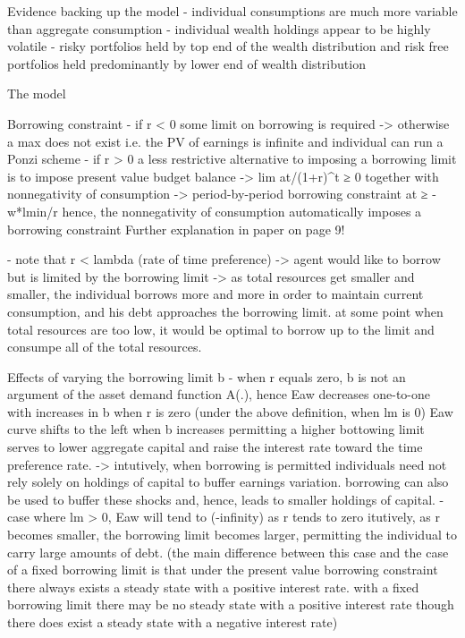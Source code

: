Evidence backing up the model
- individual consumptions are much more variable than aggregate consumption
- individual wealth holdings appear to be highly volatile
- risky portfolios held by top end of the wealth distribution and risk free portfolios held predominantly by lower end of wealth distribution

The model

Borrowing constraint
- if r < 0 some limit on borrowing is required 
	-> otherwise a max does not exist i.e. the PV of earnings is infinite and individual can run a Ponzi scheme
- if r > 0 a less restrictive alternative to imposing a borrowing limit is to impose present value budget balance  -> lim at/(1+r)^t ≥ 0 
	together with nonnegativity of consumption -> period-by-period borrowing constraint at ≥ -w*lmin/r
	hence, the nonnegativity of consumption automatically imposes a borrowing constraint 
Further explanation in paper on page 9! 

- note that r < lambda (rate of time preference)
	-> agent would like to borrow but is limited by the borrowing limit
		-> as total resources get smaller and smaller, the individual borrows more and more in order to maintain current consumption, and his debt approaches the borrowing limit. at some point when total resources are too low, it would be optimal to borrow up to the limit and consumpe all of the total resources. 

Effects of varying the borrowing limit b
- when r equals zero, b is not an argument of the asset demand function A(.), hence Eaw decreases one-to-one with increases in b when r is zero (under the above definition, when lm is 0)
	Eaw curve shifts to the left when b increases permitting a higher bottowing limit serves to lower aggregate capital and raise the interest rate toward the time preference rate. 
	-> intutively, when borrowing is permitted individuals need not rely solely on holdings of capital to buffer earnings variation. borrowing can also be used to buffer these shocks and, hence, leads to smaller holdings of capital.
- case where lm > 0, Eaw will tend to (-infinity) as r tends to zero
	itutively, as r becomes smaller, the borrowing limit becomes larger, permitting the individual to carry large amounts of debt. 
	(the main difference between this case and the case of a fixed borrowing limit is that under the present value borrowing constraint there always exists a steady state with a positive interest rate. with a fixed borrowing limit there may be no steady state with a positive interest rate though there does exist a steady state with a negative interest rate)


